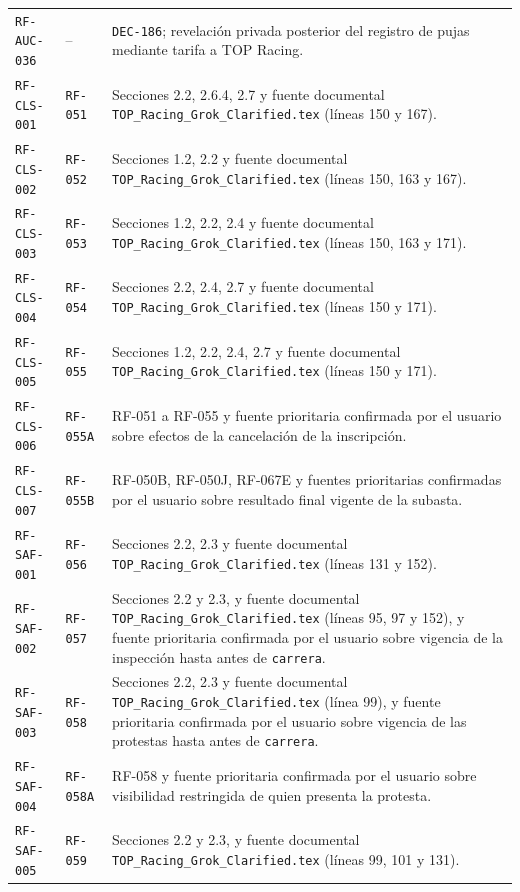 \documentclass[10pt,letterpaper]{article}
\begin{document}
\begin{landscape}
\begin{longtable}{P{2.7cm}P{2.6cm}P{15.7cm}}
\texttt{RF-AUC-036} & -- & \texttt{DEC-186}; revelación privada posterior del registro de pujas mediante tarifa a TOP Racing.\\
\texttt{RF-CLS-001} & \texttt{RF-051} & Secciones 2.2, 2.6.4, 2.7 y fuente documental \texttt{TOP\_Racing\_Grok\_Clarified.tex} (líneas 150 y 167).\\
\texttt{RF-CLS-002} & \texttt{RF-052} & Secciones 1.2, 2.2 y fuente documental \texttt{TOP\_Racing\_Grok\_Clarified.tex} (líneas 150, 163 y 167).\\
\texttt{RF-CLS-003} & \texttt{RF-053} & Secciones 1.2, 2.2, 2.4 y fuente documental \texttt{TOP\_Racing\_Grok\_Clarified.tex} (líneas 150, 163 y 171).\\
\texttt{RF-CLS-004} & \texttt{RF-054} & Secciones 2.2, 2.4, 2.7 y fuente documental \texttt{TOP\_Racing\_Grok\_Clarified.tex} (líneas 150 y 171).\\
\texttt{RF-CLS-005} & \texttt{RF-055} & Secciones 1.2, 2.2, 2.4, 2.7 y fuente documental \texttt{TOP\_Racing\_Grok\_Clarified.tex} (líneas 150 y 171).\\
\texttt{RF-CLS-006} & \texttt{RF-055A} & RF-051 a RF-055 y fuente prioritaria confirmada por el usuario sobre efectos de la cancelación de la inscripción.\\
\texttt{RF-CLS-007} & \texttt{RF-055B} & RF-050B, RF-050J, RF-067E y fuentes prioritarias confirmadas por el usuario sobre resultado final vigente de la subasta.\\
\texttt{RF-SAF-001} & \texttt{RF-056} & Secciones 2.2, 2.3 y fuente documental \texttt{TOP\_Racing\_Grok\_Clarified.tex} (líneas 131 y 152).\\
\texttt{RF-SAF-002} & \texttt{RF-057} & Secciones 2.2 y 2.3, y fuente documental \texttt{TOP\_Racing\_Grok\_Clarified.tex} (líneas 95, 97 y 152), y fuente prioritaria confirmada por el usuario sobre vigencia de la inspección hasta antes de \texttt{carrera}.\\
\texttt{RF-SAF-003} & \texttt{RF-058} & Secciones 2.2, 2.3 y fuente documental \texttt{TOP\_Racing\_Grok\_Clarified.tex} (línea 99), y fuente prioritaria confirmada por el usuario sobre vigencia de las protestas hasta antes de \texttt{carrera}.\\
\texttt{RF-SAF-004} & \texttt{RF-058A} & RF-058 y fuente prioritaria confirmada por el usuario sobre visibilidad restringida de quien presenta la protesta.\\
\texttt{RF-SAF-005} & \texttt{RF-059} & Secciones 2.2 y 2.3, y fuente documental \texttt{TOP\_Racing\_Grok\_Clarified.tex} (líneas 99, 101 y 131).\\

\end{longtable}
\end{landscape}
\end{document}

